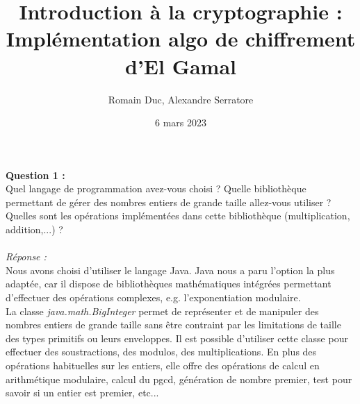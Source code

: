 \documentclass[a4paper,11pt]{article}
\title{Introduction à la cryptographie : Implémentation algo de chiffrement d'El Gamal}
\author{Romain Duc, Alexandre Serratore}
\date{6 mars 2023}
\begin{document}
        \maketitle
        \label{subsec:Q1}
        \textbf{Question 1 : \\}Quel langage de programmation avez-vous choisi ? Quelle bibliothèque permettant de gérer des nombres entiers de grande taille allez-vous utiliser ? Quelles sont les opérations implémentées dans cette bibliothèque (multiplication, addition,...) ?\\ \textit{\\Réponse :} \\Nous avons choisi d'utiliser le langage Java. Java nous a paru l'option la plus adaptée, car il dispose de bibliothèques mathématiques intégrées permettant d'effectuer des opérations complexes, e.g. l'exponentiation modulaire.\\La classe\textit{ java.math.BigInteger } permet de représenter et de manipuler des nombres entiers de grande taille sans être contraint par les limitations de taille des types primitifs ou leurs enveloppes. Il est possible d'utiliser cette classe pour effectuer des soustractions, des modulos, des multiplications. En plus des opérations habituelles sur les entiers, elle offre des opérations de calcul en arithmétique modulaire, calcul du pgcd, génération de nombre premier, test pour savoir si un entier est premier, etc...  \\\\
\end{document}
